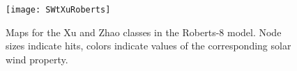 \documentclass[utf8]{frontiersSCNS} %
\begin{document}
%		
%		
%		
\begin{figure}[h!]\centering
	\texttt{[image: SWtXuRoberts]}
	\caption{Maps for the Xu and Zhao classes in the Roberts-8 model. Node sizes indicate hits, colors indicate values of the corresponding solar wind property.}\label{fig:SWtXuRoberts}
\end{figure}
\end{document}
